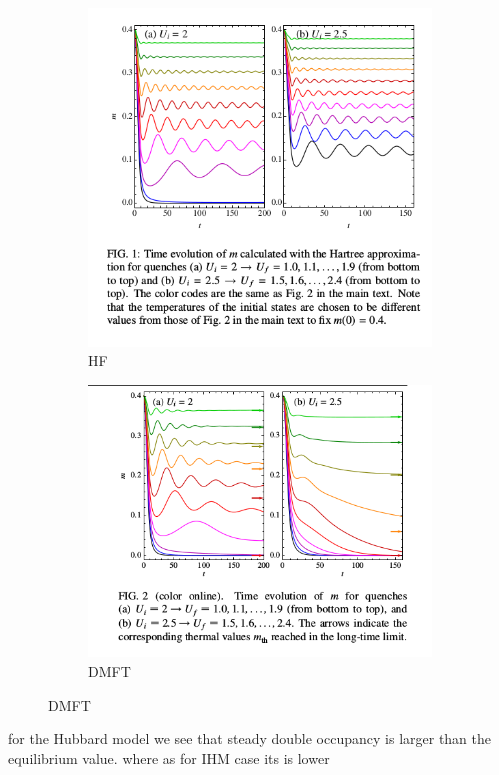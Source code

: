 \begin{figure}[H]
\begin{subfigure}{.5\textwidth}
 \includegraphics[width=0.9\linewidth]{interaction_quench_AFM/AFM_HF_m.png}
  \caption{HF}
\end{subfigure}%
\begin{subfigure}{.5\textwidth}
  \includegraphics[width=0.9\linewidth]{interaction_quench_AFM/AFM_DMFT_m.png}
  \caption{DMFT}
\end{subfigure}
\end{figure}



for the Hubbard model we see that steady double occupancy is larger than the equilibrium value. where as for IHM case its is lower 
